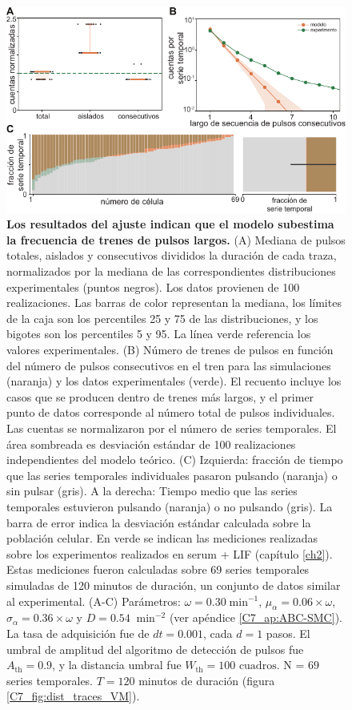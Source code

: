 \documentclass[./main.tex]{subfiles}
\begin{document}
\begin{figure}
    \centering
    \includegraphics[width=1\columnwidth]{figures/chapter7/C7_dist_validation.pdf} 
    \caption{\textbf{Los resultados del ajuste indican que el modelo subestima la frecuencia de trenes de pulsos largos.} (A) Mediana de pulsos totales, aislados y consecutivos divididos la duración de cada traza, normalizados por la mediana de las correspondientes distribuciones experimentales (puntos negros). Los datos provienen de 100 realizaciones. Las barras de color representan la mediana, los límites de la caja son los percentiles 25 y 75 de las distribuciones, y los bigotes son los percentiles 5 y 95. La línea verde referencia los valores experimentales. (B) Número de trenes de pulsos en función del número de pulsos consecutivos en el tren para las simulaciones (naranja) y los datos experimentales (verde). El recuento incluye los casos que se producen dentro de trenes más largos, y el primer punto de datos corresponde al número total de pulsos individuales. Las cuentas se normalizaron por el número de series temporales. El área sombreada es desviación estándar de 100 realizaciones independientes del modelo teórico. (C) Izquierda: fracción de tiempo que las series temporales individuales pasaron pulsando (naranja) o sin pulsar (gris). A la derecha: Tiempo medio que las series temporales estuvieron pulsando (naranja) o no pulsando (gris). La barra de error indica la desviación estándar calculada sobre la población celular. En verde se indican las mediciones realizadas sobre los experimentos realizados en serum + LIF (capítulo \ref{ch2}). Estas mediciones fueron calculadas sobre 69 series temporales simuladas de 120 minutos de duración, un conjunto de datos similar al experimental. (A-C) Parámetros:  $\omega = 0.30 \; \text{min}^{-1}$, $\mu_{\alpha} = 0.06 \times \omega$, $ \sigma_{\alpha} = 0.36 \times \omega$ y $D = 0.54 \;  \; \text{min}^{-2}$ (ver apéndice \ref{C7_ap:ABC-SMC}). La tasa de adquisición fue de $dt = 0.001$, cada $d = 1$ pasos. El umbral de amplitud del algoritmo de detección de pulsos fue $A_{\text{th}} = 0.9$, y la distancia umbral fue $W_{\text{th}} = 100\text{ cuadros}$. N = $69$ series temporales. $T = 120$ minutos de duración (figura \ref{C7_fig:dist_traces_VM}).}
    \label{C7_fig:dist_param_evaluation}
\end{figure} 
\end{document}
